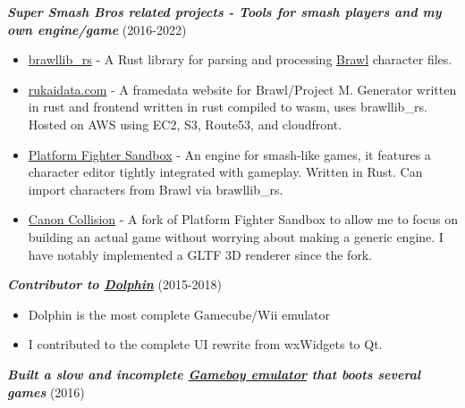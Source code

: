 \documentclass[line, resMargin, a4paper]{res}
\begin{document}
\begin{resume}
    \newpage

    \textbf{\emph{Super Smash Bros related projects - Tools for smash players and my own engine/game}} (2016-2022)
    \begin{itemize}
        \item \href{https://github.com/rukai/brawllib_rs}{brawllib\_rs} - A Rust library for parsing and processing \href{https://en.wikipedia.org/wiki/Super_Smash_Bros._Brawl}{Brawl} character files.
        \item \href{https://rukaidata.com/PM3.6/Marth/subactions/Attack11.html}{rukaidata.com} - A framedata website for Brawl/Project M. Generator written in rust and frontend written in rust compiled to wasm, uses brawllib\_rs. Hosted on AWS using EC2, S3, Route53, and cloudfront.
        \item \href{https://github.com/rukai/PF_Sandbox}{Platform Fighter Sandbox} - An engine for smash-like games, it features a character editor tightly integrated with gameplay. Written in Rust. Can import characters from Brawl via brawllib\_rs.
        \item \href{https://canoncollision.com}{Canon Collision} - A fork of Platform Fighter Sandbox to allow me to focus on building an actual game without worrying about making a generic engine. I have notably implemented a GLTF 3D renderer since the fork.
    \end{itemize}

    \textbf{\emph {Contributor to \href{https://github.com/dolphin-emu/dolphin/pulls?q=author\%3Arukai}{Dolphin}}} (2015-2018)
    \begin{itemize}
        \item Dolphin is the most complete Gamecube/Wii emulator
        \item I contributed to the complete UI rewrite from wxWidgets to Qt.
    \end{itemize}

    \textbf{\emph {Built a slow and incomplete \href{https://github.com/rukai/GameToy}{Gameboy emulator} that boots several games}} (2016)

\end{resume}
\end{document}
